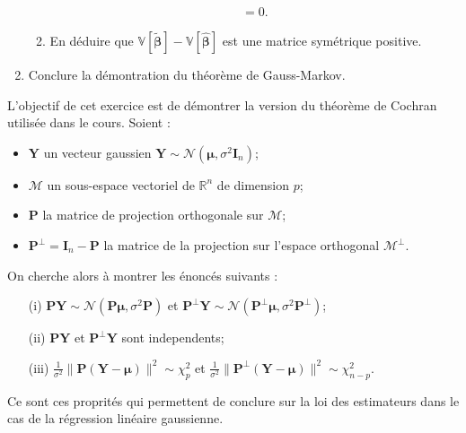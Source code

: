 \documentclass{../headers/td_upc}
\providecommand{\1}{\mathds{1}}
\begin{document}
\begin{enumerate}
\begin{enumerate}
{$$\begin{aligned}
= 0.
\end{aligned}
$$
}
\item En déduire que
$
\mathbb{V}[\tilde{\boldsymbol{\beta}}] - \mathbb{V}[\hat{\boldsymbol{\beta}}]
$ est une matrice symétrique positive.
	\end{enumerate}
	\item Conclure la démontration du théorème de Gauss-Markov.
	\end{enumerate}

  L'objectif de cet exercice est de démontrer la version du 
	théorème de Cochran utilisée dans le cours. 
	Soient :
	\begin{itemize}
	\item $\mathbf{Y}$ un vecteur gaussien $\mathbf{Y} \sim \mathcal{N}(\boldsymbol{\mu}, \sigma^2\mathbf{I}_n)$;
  \item $\mathcal{M}$ un sous-espace vectoriel de $\mathbb{R}^n$ de dimension $p$;
  \item $\mathbf{P}$ la matrice de projection orthogonale sur $\mathcal{M}$;
  \item $\mathbf{P}^{\bot} = \mathbf{I}_n - \mathbf{P}$ la matrice de la projection sur l'espace orthogonal $\mathcal{M}^{\bot}$.
	\end{itemize}
	On cherche alors à montrer les énoncés suivants :
	\begin{itemize}
	\item[(i)] $\mathbf{P}\mathbf{Y} \sim \mathcal{N}(\mathbf{P}\boldsymbol{\mu}, \sigma^2\mathbf{P})$
et
$\mathbf{P}^{\bot}\mathbf{Y} \sim \mathcal{N}(\mathbf{P}^{\bot}\boldsymbol{\mu}, \sigma^2\mathbf{P}^{\bot})$;
	\item[(ii)] $\mathbf{P}\mathbf{Y}$ et $\mathbf{P}^{\bot}\mathbf{Y}$ sont independents;
	\item[(iii)]
$\frac{1}{\sigma^2}\|\mathbf{P}(\mathbf{Y} - \boldsymbol{\mu}) \|^2 \sim \chi^2_{p}$
et
$\frac{1}{\sigma^2}\|\mathbf{P}^{\bot}(\mathbf{Y} - \boldsymbol{\mu}) \|^2 \sim \chi^2_{n - p}$.
	\end{itemize}
	Ce sont ces proprités qui permettent de conclure sur la loi des estimateurs dans le
	cas de la régression linéaire gaussienne.
\end{document}
